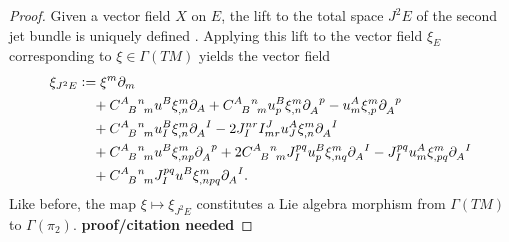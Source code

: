 \begin{proof}
  Given a vector field $X$ on $E$, the lift to the total space $J^2E$ of the second jet bundle is uniquely defined \cite{saunders_jet_bundles}. Applying this lift to the vector field $\xi_E$ corresponding to $\xi\in \Gamma(TM)$ yields the vector field
  \begin{equation}
    \begin{aligned}
      \xi_{J^2E} &{} \vcentcolon= \xi^m\partial_m \\
                 &{} \hphantom{\vcentcolon=} + \gmc{A}{B}{n}{m} u^B \xi^m_{,n}\partial_A + \gmc{A}{B}{n}{m} u^B_p\xi^m_{,n}\partial_A^{\hphantom Ap} - u^A_m\xi^m_{,p}\partial_A^{\hphantom Ap} \\
                 &{} \hphantom{\vcentcolon=} + \gmc{A}{B}{n}{m} u^B_I \xi^m_{,n} \partial_A^{\hphantom AI} - 2 J_I^{nr}I^J_{mr}u^A_J\xi^m_{,n}\partial_A^{\hphantom AI} \\
                 &{} \hphantom{\vcentcolon=} + \gmc{A}{B}{n}{m} u^B \xi^m_{,np} \partial_A^{\hphantom Ap} + 2 \gmc{A}{B}{n}{m} J_I^{pq} u^B_p \xi^m_{,nq} \partial_A^{\hphantom AI} - J_I^{pq} u^A_m \xi^m_{,pq} \partial_A^{\hphantom AI} \\
                 &{} \hphantom{\vcentcolon=} + \gmc{A}{B}{n}{m} J_I^{pq} u^B \xi^m_{,npq} \partial_A^{\hphantom AI}.
    \end{aligned}
  \end{equation}
  Like before, the map $\xi\mapsto\xi_{J^2E}$ constitutes a Lie algebra morphism from $\Gamma(TM)$ to $\Gamma(\pi_2)$. \textbf{proof/citation needed}


\end{proof}
